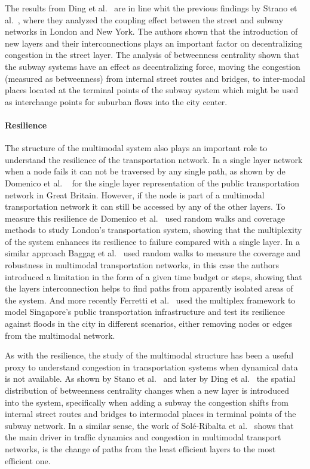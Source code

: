 The results from Ding et al.~\cite{ding2018traffic} are in line whit the previous findings by Strano et al.~\cite{strano2015features}, where they analyzed the coupling effect between the street and subway networks in London and New York. The authors shown that the introduction of new layers and their interconnections plays an important factor on decentralizing congestion in the street layer. The analysis of betweenness centrality shown that the subway systems have an effect as decentralizing force, moving the congestion (measured as betweenness) from internal street routes and bridges, to inter-modal places located at the terminal points of the subway system which might be used as interchange points for suburban flows into the city center.


\paragraph*{Resilience}
The structure of the multimodal system also plays an important role to understand the resilience of the transportation network. In a single layer network when a node fails it can not be traversed by any single path, as shown by de Domenico et al. ~\cite{dedomenico2019public} for the single layer representation of the public transportation network in Great Britain. However, if the node is part of a multimodal transportation network it can still be accessed by any of the other layers. To measure this resilience de Domenico et al.~\cite{dedomenico2014interconnected} used random walks and coverage methods to study London's transportation system, showing that the multiplexity of the system enhances its resilience to failure compared with a single layer. In a similar approach Baggag et al.~\cite{baggag2018resilience} used random walks to measure the coverage and robustness in multimodal transportation networks, in this case the authors introduced a limitation in the form of a given time budget or steps, showing that the layers interconnection helps to find paths from apparently isolated areas of the system. And more recently Ferretti et al.~\cite{ferretti2019resilience} used the multiplex framework to model Singapore's public transportation infrastructure and test its resilience against floods in the city in different scenarios, either removing nodes or edges from the multimodal network.

As with the resilience, the study of the multimodal structure has been a useful proxy to understand congestion in transportation systems when dynamical data is not available. As shown by Stano et al.~\cite{strano2015features} and later by Ding et al.~\cite{ding2018traffic} the spatial distribution of betweenness centrality changes when a new layer is introduced into the system, specifically when adding a subway the congestion shifts from internal street routes and bridges to intermodal places in terminal points of the subway network. In a similar sense, the work of Sol\'{e}-Ribalta et al.~\cite{sole-ribalta2016congestion} shows that the main driver in traffic dynamics and congestion in multimodal transport networks, is the change of paths from the least efficient layers to the most efficient one.


